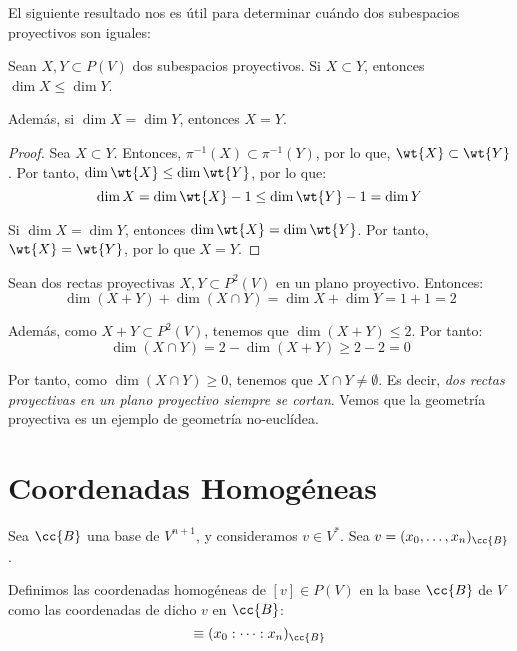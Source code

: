 El siguiente resultado nos es útil para determinar cuándo dos subespacios proyectivos son iguales:
\begin{prop}
    Sean $X,Y\subset P(V)$ dos subespacios proyectivos. Si $X\subset Y$, entonces $\dim X \leq \dim Y$.

    Además, si $\dim X = \dim Y$, entonces $X=Y$.
\end{prop}
\begin{proof}
    Sea $X\subset Y$. Entonces, $\pi^{-1}(X)\subset \pi^{-1}(Y)$, por lo que, $\wt{X} \subset \wt{Y}$. Por tanto, $\dim \wt{X} \leq \dim \wt{Y}$, por lo que:
    \begin{equation*}
        \dim X = \dim \wt{X} - 1 \leq \dim \wt{Y} - 1 = \dim Y
    \end{equation*}

    Si $\dim X = \dim Y$, entonces $\dim \wt{X} = \dim \wt{Y}$. Por tanto, $\wt{X}=\wt{Y}$, por lo que $X=Y$.
\end{proof}

\begin{ejemplo}
    Sean dos rectas proyectivas $X,Y\subset P^2({V})$ en un plano proyectivo. Entonces:
    \begin{equation*}
        \dim (X+Y) + \dim (X\cap Y) = \dim X + \dim Y = 1+1 = 2
    \end{equation*}

    Además, como $X+Y\subset P^2({V})$, tenemos que $\dim (X+Y) \leq 2$. Por tanto:
    \begin{equation*}
        \dim (X\cap Y) = 2 - \dim (X+Y) \geq 2 - 2 = 0
    \end{equation*}

    Por tanto, como $\dim (X\cap Y) \geq 0$, tenemos que $X\cap Y\neq \emptyset$. Es decir, \emph{dos rectas proyectivas en un plano proyectivo siempre se cortan}.
    Vemos que la geometría proyectiva es un ejemplo de geometría no-euclídea.
\end{ejemplo}



\section{Coordenadas Homogéneas}

Sea $\cc{B}$ una base de $V^{n+1}$, y consideramos $v \in V^\ast$. Sea $v=(x_0,\dots,x_n)_{\cc{B}}$.

Definimos las coordenadas homogéneas de $[v]\in P(V)$ en la base $\cc{B}$ de $V$ como las coordenadas de dicho $v$ en $\cc{B}$:
\begin{equation*}
    [v] \equiv (x_0:\dots :x_n)_{\cc{B}}
\end{equation*}

